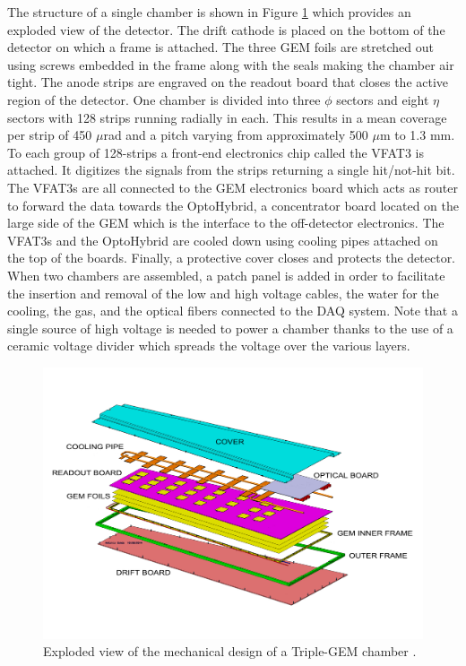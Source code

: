     The structure of a single chamber is shown in Figure \ref{fig:II-1-exploded} which provides an exploded view of the detector. The drift cathode is placed on the bottom of the detector on which a frame is attached. The three GEM foils are stretched out using screws embedded in the frame along with the seals making the chamber air tight. The anode strips are engraved on the readout board that closes the active region of the detector. One chamber is divided into three $ \phi $ sectors and eight $ \eta $ sectors with 128 strips running radially in each. This results in a mean coverage per strip of 450 $\mu$rad and a pitch varying from approximately 500 $\mu$m to 1.3 mm. To each group of 128-strips a front-end electronics chip called the VFAT3 is attached. It digitizes the signals from the strips returning a single hit/not-hit bit. The VFAT3s are all connected to the GEM electronics board which acts as router to forward the data towards the OptoHybrid, a concentrator board located on the large side of the GEM which is the interface to the off-detector electronics. The VFAT3s and the OptoHybrid are cooled down using cooling pipes attached on the top of the boards. Finally, a protective cover closes and protects the detector. When two chambers are assembled, a patch panel is added in order to facilitate the insertion and removal of the low and high voltage cables, the water for the cooling, the gas, and the optical fibers connected to the DAQ system. Note that a single source of high voltage is needed to power a chamber thanks to the use of a ceramic voltage divider which spreads the voltage over the various layers. \\

    \begin{figure}[h!]
      \centering
      \includegraphics[width=\textwidth]{img/II-1-gem/gem-exploded.pdf}
      \caption{Exploded view of the mechanical design of a Triple-GEM chamber \cite{Colaleo:2021453}.}
      \label{fig:II-1-exploded}
    \end{figure}


